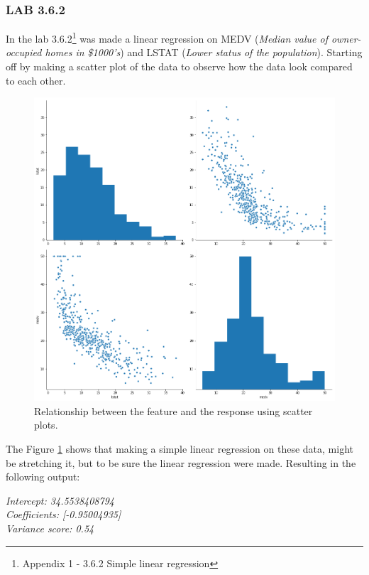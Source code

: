\subsubsection*{LAB 3.6.2}
In the lab 3.6.2\footnote{Appendix 1 - 3.6.2 Simple linear regression} was made a linear regression on MEDV (\textit{Median value of owner-occupied homes in \$1000's}) and LSTAT (\textit{Lower status of the population}). Starting off by making a scatter plot of the data to observe how the data look compared to each other.

\begin{figure}[h]
	\centering
	\includegraphics[scale=0.4, trim=0 0 0 500, clip=true]{regression/multipleLinearRegression/fig/bostonPairplotMdevLstat.png}
	\caption{Relationship between the feature and the response using scatter plots.}
	\label{fig:bostonPairplotMdevLstat}
\end{figure}

The Figure \ref{fig:bostonPairplotMdevLstat} shows that making a simple linear regression on these data, might be stretching it, but to be sure the linear regression were made. Resulting in the following output:

\noindent\textit{Intercept: 34.5538408794\\
Coefficients: [-0.95004935]\\
Variance score: 0.54\\}

